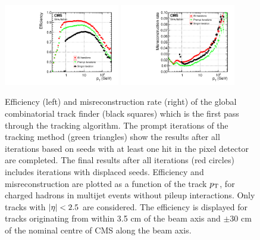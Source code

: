 \begin{figure}[htbp]
\centering
     \includegraphics[width=0.45\textwidth]{object_reconstruction_and_selection/plots/pf_track_eff.pdf}
     \includegraphics[width=0.45\textwidth]{object_reconstruction_and_selection/plots/pf_track_misId.pdf}
     \caption{
Efficiency (left) and misreconstruction rate (right) of the global combinatorial track finder (black squares) 
which is the first pass through the tracking algorithm. The prompt iterations of the tracking method (green 
triangles) show the results after all iterations based on seeds with at least one 
hit in the pixel detector are completed. The final results after all iterations (red circles) includes
iterations with displaced seeds. Efficiency and misreconstruction are plotted as a function 
of the track $p_\mathrm{T}$, for charged hadrons in multijet events without pileup interactions. Only tracks with 
$\lvert\eta\rvert < 2.5$ are considered. The efficiency 
is displayed for tracks originating from within 3.5 cm of the beam axis and $\pm$30 cm of the nominal 
centre of CMS along the beam axis.
     }
     \label{fig:kf_tracking}
\end{figure}

